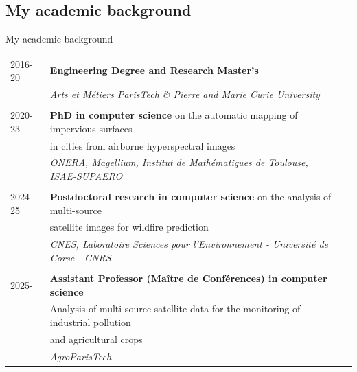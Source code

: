\documentclass[aspectratio=169, 9pt]{beamer}
\begin{document}
\subsection{My academic background}
\begin{frame}{My academic background}


\begin{tabular}{lll}
    2016-20 & \textbf{Engineering Degree and Research Master's} \\
    & \textit{Arts et Métiers ParisTech \& Pierre and Marie Curie University} \\
    & \\
    2020-23 & \textbf{PhD in computer science} on the automatic mapping of impervious surfaces \\
    & in cities from airborne hyperspectral images \\
    & \textit{ONERA, Magellium, Institut de Mathématiques de Toulouse, ISAE-SUPAERO} \\
    & \\
    2024-25 & \textbf{Postdoctoral research in computer science} on the analysis of multi-source \\
    & satellite images for wildfire prediction \\
    & \textit{CNES, Laboratoire Sciences pour l'Environnement - Université de Corse - CNRS} \\
    & \\
    2025- & \textbf{Assistant Professor (Maître de Conférences) in computer science} \\
    & Analysis of multi-source satellite data for the monitoring of industrial pollution \\
    & and agricultural crops \\
    & \textit{AgroParisTech}
\end{tabular}

\end{frame}
\end{document}
